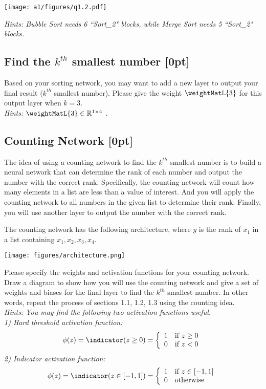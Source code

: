     \begin{center}
        \texttt{[image: a1/figures/q1.2.pdf]}
    \end{center}
    
    \noindent \emph{Hints: Bubble Sort needs 6 ``Sort\_2" blocks, while Merge Sort needs 5 ``Sort\_2" blocks.}

\subsection{Find the $k^{th}$ smallest number {[0pt]}}
Based on your sorting network, you may want to add a new layer to output your final result ($k^{th}$ smallest number). Please give the weight $\weightMatL{3}$ for this output layer when $k=3$. \\

\noindent \emph{Hints: $\weightMatL{3} \in \mathbb{R}^{1 \times 4}$ .}

\subsection{Counting Network {[0pt]}}
The idea of using a counting network to find the $k^{th}$ smallest number is to build a neural network that can determine the rank of each number and output the number with the correct rank. 
Specifically, the counting network will count how many elements in a list are less than a value of interest. And you will apply the counting network to all numbers in the given list to determine their rank. Finally, you will use another layer to output the number with the correct rank.

\noindent The counting network has the following architecture, where $y$ is the rank of $x_1$ in a list containing $x_1, x_2, x_3, x_4$. 
    \begin{center}
        \texttt{[image: figures/architecture.png]} 
    \end{center} 
    
\noindent Please specify the weights and activation functions for your counting network. Draw a diagram to show how you will use the counting network and give a set of weights and biases for the final layer to find the $k^{th}$ smallest number. In other words, repeat the process of sections 1.1, 1.2, 1.3 using the counting idea. \\

\noindent \emph{Hints: You may find the following two activation functions useful.} \\
\noindent \emph{1) Hard threshold activation function:}
    \[ \phi(z) = \indicator(z \geq 0) = \left\{ \begin{array}{ll} 1 & \textrm{if } z \geq 0 \\ 0 & \textrm{if } z < 0 \end{array} \right. \]
\emph{2) Indicator activation function:}
    \[ \phi(z) = \indicator(z \in [-1, 1]) = \left\{ \begin{array}{ll} 1 & \textrm{if } z \in [-1, 1] \\ 0 & \textrm{otherwise} \end{array} \right. \]


